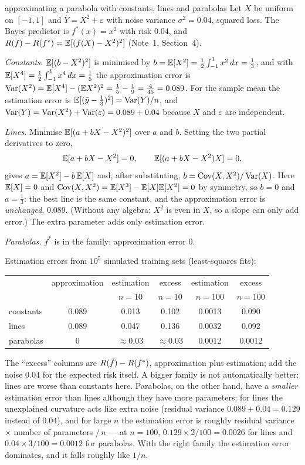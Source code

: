 \documentclass[11pt]{article}
\begin{document}
\begin{worked}{approximating a parabola with constants, lines and parabolas}
Let $X$ be uniform on $[-1, 1]$ and $Y = X^2 + \varepsilon$ with noise variance $\sigma^2 = 0.04$, squared loss. The
Bayes predictor is $f^*(x) = x^2$ with risk $0.04$, and $R(f) - R(f^*) = \mathbb{E}[(f(X) - X^2)^2]$ (Note~1,
Section~4).

\emph{Constants.} $\mathbb{E}[(b - X^2)^2]$ is minimised by $b = \mathbb{E}[X^2] = \frac12\int_{-1}^{1} x^2\,dx = \frac13$, and
with $\mathbb{E}[X^4] = \frac12\int_{-1}^{1} x^4\,dx = \frac15$ the approximation error is
$\operatorname{Var}(X^2) = \mathbb{E}[X^4] - (\mathbb{E} X^2)^2 = \frac15 - \frac19 = \frac{4}{45} = 0.089$. For the sample mean the estimation
error is $\mathbb{E}[(\bar y - \frac13)^2] = \operatorname{Var}(Y)/n$, and $\operatorname{Var}(Y) = \operatorname{Var}(X^2) + \operatorname{Var}(\varepsilon) = 0.089 + 0.04$
because $X$ and $\varepsilon$ are independent.

\emph{Lines.} Minimise $\mathbb{E}[(a + bX - X^2)^2]$ over $a$ and $b$. Setting the two partial derivatives to zero,
\[
  \mathbb{E}[a + bX - X^2] = 0, \qquad \mathbb{E}[(a + bX - X^2)X] = 0,
\]
gives $a = \mathbb{E}[X^2] - b\,\mathbb{E}[X]$ and, after substituting, $b = \operatorname{Cov}(X, X^2)/\operatorname{Var}(X)$. Here $\mathbb{E}[X] = 0$ and
$\operatorname{Cov}(X, X^2) = \mathbb{E}[X^3] - \mathbb{E}[X]\mathbb{E}[X^2] = 0$ by symmetry, so $b = 0$ and $a = \frac13$: the best line is the same
constant, and the approximation error is \emph{unchanged}, $0.089$. (Without any algebra: $X^2$ is even in $X$, so a
slope can only add error.) The extra parameter adds only estimation error.

\emph{Parabolas.} $f^*$ is in the family: approximation error $0$.

Estimation errors from $10^5$ simulated training sets (least-squares fits):
\begin{center}\small
\begin{tabular}{@{}lccccc@{}}
\toprule
 & approximation & estimation & excess & estimation & excess \\
 & & $n = 10$ & $n = 10$ & $n = 100$ & $n = 100$ \\
\midrule
constants & 0.089 & 0.013 & 0.102 & 0.0013 & 0.090 \\
lines & 0.089 & 0.047 & 0.136 & 0.0032 & 0.092 \\
parabolas & 0 & $\approx 0.03$ & $\approx 0.03$ & 0.0012 & 0.0012 \\
\bottomrule
\end{tabular}
\end{center}
The ``excess'' columns are $R(\hat f) - R(f^*)$, approximation plus estimation; add the noise $0.04$ for the
expected risk itself. A bigger family is not automatically better: lines are worse than constants here. Parabolas, on
the other hand, have a \emph{smaller} estimation error than lines although they have more parameters: for lines the
unexplained curvature acts like extra noise (residual variance $0.089 + 0.04 = 0.129$ instead of $0.04$), and for
large $n$ the estimation error is roughly residual variance $\times$ number of parameters $/\,n$ --- at $n = 100$,
$0.129 \times 2/100 = 0.0026$ for lines and $0.04 \times 3/100 = 0.0012$ for parabolas. With the right family the
estimation error dominates, and it falls roughly like $1/n$.
\end{worked}
\end{document}
